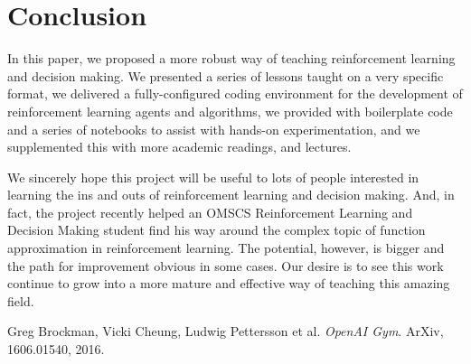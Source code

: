 \documentclass[11pt]{article} %
\begin{document}
\section{Conclusion}

In this paper, we proposed a more robust way of teaching reinforcement learning
and decision making. We presented a series of lessons taught on a very specific
format, we delivered a fully-configured coding environment for the development
of reinforcement learning agents and algorithms, we provided with boilerplate
code and a series of notebooks to assist with hands-on experimentation, and we
supplemented this with more academic readings, and lectures.

We sincerely hope this project will be useful to lots of people interested in
learning the ins and outs of reinforcement learning and decision making. And,
in fact, the project recently helped an OMSCS Reinforcement Learning and
Decision Making student find his way around the complex topic of function
approximation in reinforcement learning. The potential, however, is bigger and
the path for improvement obvious in some cases. Our desire is to see this
work continue to grow into a more mature and effective way of teaching this
amazing field.

\medskip
 
\begin{thebibliography}{9}

  Greg Brockman, Vicki Cheung, Ludwig Pettersson et al.
\textit{OpenAI Gym}. 
ArXiv, 1606.01540, 2016.
 
\end{thebibliography}
\end{document}
